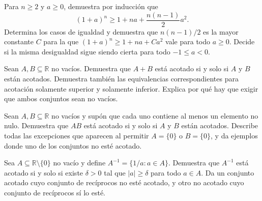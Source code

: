 \begin{samepage}
\begin{problem}\label{prob:reto-absoluto-10}
Para $n\ge2$ y $a\ge0$, demuestra por inducción que
\[
(1+a)^n\ge1+na+\frac{n(n-1)}2a^2.
\]
Determina los casos de igualdad y demuestra que $n(n-1)/2$ es la mayor constante $C$ para la que $(1+a)^n\ge1+na+Ca^2$ vale para todo $a\ge0$. Decide si la misma desigualdad sigue siendo cierta para todo $-1\le a<0$.
\end{problem}
\end{samepage}
\par{}

\begin{samepage}
\begin{problem}\label{prob:reto-acotacion-01}
Sean $A,B\subseteq\mathbb R$ no vacíos. Demuestra que $A+B$ está acotado si y solo si $A$ y $B$ están acotados. Demuestra también las equivalencias correspondientes para acotación solamente superior y solamente inferior. Explica por qué hay que exigir que ambos conjuntos sean no vacíos.~\cite{mseSumaAcotada}
\end{problem}
\end{samepage}
\par{}

\begin{samepage}
\begin{problem}\label{prob:reto-acotacion-02}
Sean $A,B\subseteq\mathbb R$ no vacíos y supón que cada uno contiene al menos un elemento no nulo. Demuestra que $AB$ está acotado si y solo si $A$ y $B$ están acotados. Describe todas las excepciones que aparecen al permitir $A=\{0\}$ o $B=\{0\}$, y da ejemplos donde uno de los conjuntos no esté acotado.
\end{problem}
\end{samepage}
\par{}

\begin{samepage}
\begin{problem}\label{prob:reto-acotacion-03}
Sea $A\subseteq\mathbb R\setminus\{0\}$ no vacío y define $A^{-1}=\{1/a:a\in A\}$. Demuestra que $A^{-1}$ está acotado si y solo si existe $\delta>0$ tal que $|a|\ge\delta$ para todo $a\in A$. Da un conjunto acotado cuyo conjunto de recíprocos no esté acotado, y otro no acotado cuyo conjunto de recíprocos sí lo esté.~\cite{mseAlejadoCero}
\end{problem}
\end{samepage}
\par{}


